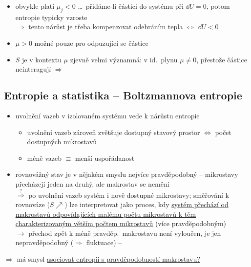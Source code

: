 \begin{itemize}
  \item[$\to$] obvykle platí $\mu_j < 0$ \dots\ přidáme-li částici do systému při $\dd U = 0$, potom entropie typicky vzroste \\
  $\Rightarrow$ tento nárůst je třeba kompenzovat odebráním tepla $\Leftrightarrow$ $\dd U < 0$
  \item[$\to$] $\mu > 0$ možné pouze pro odpuzující se částice
  \item[$\to$] $S$ je v kontextu $\mu$ zjevně velmi významná: v id.\ plynu $\mu\neq 0$, přestože částice neinteragují $\Rightarrow$ 
\end{itemize}

\subsection{Entropie a statistika -- Boltzmannova entropie}
\begin{itemize}
  \item uvolnění vazeb v izolovaném systému vede k nárůstu entropie
  \begin{itemize}
    \item[$\to$] uvolnění vazeb zároveň zvětšuje dostupný stavový prostor $\Leftrightarrow$ počet dostupných mikrostavů
    \item[$\to$] méně vazeb $\equiv$ menší uspořádanost
  \end{itemize}
  \item rovnovážný stav je v nějakém smyslu nejvíce pravděpodobný -- mikrostavy přecházejí jeden na druhý, ale makrostav se nemění \\
  $\overset{?}{\Rightarrow}$ po uvolnění vazeb systém  i nově dostupné mikrostavy; směřování k rovnováze ($S\nearrow$) lze interpretovat jako proces, kdy \uline{systém přechází od makrostavů odpovídajících malému počtu mikrostavů k těm charakterizovaným větším počtem mikrostavů} (více pravděpodobným) \\
  $\to$ přechod zpět k méně pravděp.\ makrostavu není vyloučen, je jen nepravděpodobný ($\Rightarrow$ fluktuace) -- 
\end{itemize}
$\Rightarrow$ má smysl \underline{asociovat entropii s pravděpodobností makrostavu?}

